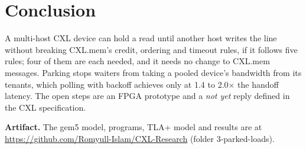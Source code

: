 \documentclass[journal]{IEEEtran}
\begin{document}
\section{Conclusion}
A multi-host CXL device can hold a read until another host writes the line without breaking
CXL.mem's credit, ordering and timeout rules, if it follows five rules; four of them are each
needed, and it needs no change to CXL.mem messages. Parking stops waiters from taking a pooled
device's bandwidth from its tenants, which polling with backoff achieves only at 1.4 to 2.0$\times$ the
handoff latency. The open steps are an
FPGA prototype and a \emph{not yet} reply defined in the CXL specification.

\textbf{Artifact.} The gem5 model, programs, TLA+ model and results are at
\url{https://github.com/Romyull-Islam/CXL-Research} (folder 3-parked-loads).



\end{document}
